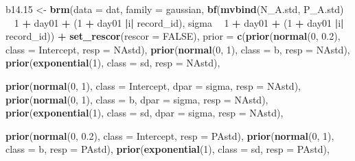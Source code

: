 \documentclass[]{article}
\newenvironment{Shaded}{\begin{snugshade}}{\end{snugshade}}
\newcommand{\DataTypeTok}[1]{\textcolor[rgb]{0.13,0.29,0.53}{#1}}
\newcommand{\DecValTok}[1]{\textcolor[rgb]{0.00,0.00,0.81}{#1}}
\newcommand{\FloatTok}[1]{\textcolor[rgb]{0.00,0.00,0.81}{#1}}
\newcommand{\KeywordTok}[1]{\textcolor[rgb]{0.13,0.29,0.53}{\textbf{#1}}}
\newcommand{\NormalTok}[1]{#1}
\newcommand{\OperatorTok}[1]{\textcolor[rgb]{0.81,0.36,0.00}{\textbf{#1}}}
\newcommand{\OtherTok}[1]{\textcolor[rgb]{0.56,0.35,0.01}{#1}}
\newcommand{\StringTok}[1]{\textcolor[rgb]{0.31,0.60,0.02}{#1}}
\begin{document}
\begin{Shaded}
\begin{Highlighting}[]
\NormalTok{b14}\FloatTok{.15}\NormalTok{ <-}
\StringTok{  }\KeywordTok{brm}\NormalTok{(}\DataTypeTok{data =}\NormalTok{ dat,}
      \DataTypeTok{family =}\NormalTok{ gaussian,}
      \KeywordTok{bf}\NormalTok{(}\KeywordTok{mvbind}\NormalTok{(N_A.std, P_A.std) }\OperatorTok{~}\StringTok{ }\DecValTok{1} \OperatorTok{+}\StringTok{ }\NormalTok{day01 }\OperatorTok{+}\StringTok{ }\NormalTok{(}\DecValTok{1} \OperatorTok{+}\StringTok{ }\NormalTok{day01 }\OperatorTok{|}\NormalTok{i}\OperatorTok{|}\StringTok{ }\NormalTok{record_id),}
\NormalTok{         sigma }\OperatorTok{~}\StringTok{ }\DecValTok{1} \OperatorTok{+}\StringTok{ }\NormalTok{day01 }\OperatorTok{+}\StringTok{ }\NormalTok{(}\DecValTok{1} \OperatorTok{+}\StringTok{ }\NormalTok{day01 }\OperatorTok{|}\NormalTok{i}\OperatorTok{|}\StringTok{ }\NormalTok{record_id)) }\OperatorTok{+}\StringTok{ }\KeywordTok{set_rescor}\NormalTok{(}\DataTypeTok{rescor =} \OtherTok{FALSE}\NormalTok{),}
      \DataTypeTok{prior =} \KeywordTok{c}\NormalTok{(}\KeywordTok{prior}\NormalTok{(}\KeywordTok{normal}\NormalTok{(}\DecValTok{0}\NormalTok{, }\FloatTok{0.2}\NormalTok{), }\DataTypeTok{class =}\NormalTok{ Intercept, }\DataTypeTok{resp =}\NormalTok{ NAstd),}
                \KeywordTok{prior}\NormalTok{(}\KeywordTok{normal}\NormalTok{(}\DecValTok{0}\NormalTok{, }\DecValTok{1}\NormalTok{), }\DataTypeTok{class =}\NormalTok{ b, }\DataTypeTok{resp =}\NormalTok{ NAstd),}
                \KeywordTok{prior}\NormalTok{(}\KeywordTok{exponential}\NormalTok{(}\DecValTok{1}\NormalTok{), }\DataTypeTok{class =}\NormalTok{ sd, }\DataTypeTok{resp =}\NormalTok{ NAstd),}
                
                \KeywordTok{prior}\NormalTok{(}\KeywordTok{normal}\NormalTok{(}\DecValTok{0}\NormalTok{, }\DecValTok{1}\NormalTok{), }\DataTypeTok{class =}\NormalTok{ Intercept, }\DataTypeTok{dpar =}\NormalTok{ sigma, }\DataTypeTok{resp =}\NormalTok{ NAstd),}
                \KeywordTok{prior}\NormalTok{(}\KeywordTok{normal}\NormalTok{(}\DecValTok{0}\NormalTok{, }\DecValTok{1}\NormalTok{), }\DataTypeTok{class =}\NormalTok{ b, }\DataTypeTok{dpar =}\NormalTok{ sigma, }\DataTypeTok{resp =}\NormalTok{ NAstd),}
                \KeywordTok{prior}\NormalTok{(}\KeywordTok{exponential}\NormalTok{(}\DecValTok{1}\NormalTok{), }\DataTypeTok{class =}\NormalTok{ sd, }\DataTypeTok{dpar =}\NormalTok{ sigma, }\DataTypeTok{resp =}\NormalTok{ NAstd),}
                
                \KeywordTok{prior}\NormalTok{(}\KeywordTok{normal}\NormalTok{(}\DecValTok{0}\NormalTok{, }\FloatTok{0.2}\NormalTok{), }\DataTypeTok{class =}\NormalTok{ Intercept, }\DataTypeTok{resp =}\NormalTok{ PAstd),}
                \KeywordTok{prior}\NormalTok{(}\KeywordTok{normal}\NormalTok{(}\DecValTok{0}\NormalTok{, }\DecValTok{1}\NormalTok{), }\DataTypeTok{class =}\NormalTok{ b, }\DataTypeTok{resp =}\NormalTok{ PAstd),}
                \KeywordTok{prior}\NormalTok{(}\KeywordTok{exponential}\NormalTok{(}\DecValTok{1}\NormalTok{), }\DataTypeTok{class =}\NormalTok{ sd, }\DataTypeTok{resp =}\NormalTok{ PAstd),}
                

\end{Highlighting}
\end{Shaded}
\end{document}
